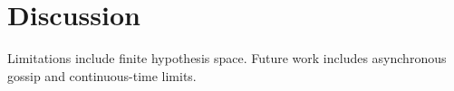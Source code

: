 \section{Discussion}

Limitations include finite hypothesis space. Future work includes asynchronous gossip and continuous-time limits.

